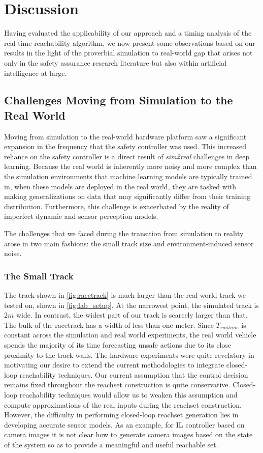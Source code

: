 \documentclass[manuscript,screen,review]{acmart}
\begin{document}
\section{Discussion}

Having evaluated the applicability of our approach and a timing analysis of the real-time reachability algorithm, we now present some observations based on our results in the light of the proverbial simulation to real-world gap that arises not only in the safety assurance research literature but also within artificial intelligence at large.

\subsection{Challenges Moving from Simulation to the Real World}

Moving from simulation to the real-world hardware platform saw a significant expansion in the frequency that the safety controller was used. This increased reliance on the safety controller is a direct result of \emph{sim2real} challenges in deep learning. Because the real world is inherently more noisy and more complex than the simulation environments that machine learning models are typically trained in, when these models are deployed in the real world, they are tasked with making generalizations on data that may significantly differ from their training distribution. Furthermore, this challenge is exacerbated by the reality of imperfect dynamic and sensor perception models\cite{ivanov2020case}.

The challenges that we faced during the transition from simulation to reality arose in two main fashions: the small track size and environment-induced sensor noise.

\subsubsection{The Small Track} The track shown in \ref{fig:racetrack} is much larger than the real world track we tested on, shown in \ref{fig:lab_setup}. At the narrowest point, the simulated track is $2m$ wide. In contrast, the widest part of our track is scarcely larger than that. The bulk of the racetrack has a width of less than one meter. Since $T_{runtime}$ is constant across the simulation and real world experiments, the real world vehicle spends the majority of its time forecasting unsafe actions due to its close proximity to the track walls. The hardware experiments were quite revelatory in motivating our desire to extend the current methodologies to integrate closed-loop reachability techniques. Our current assumption that the control decision remains fixed throughout the reachset construction is quite conservative. Closed-loop reachability techniques would allow us to weaken this assumption and compute approximations of the real inputs during the reachset construction. However, the difficulty in performing closed-loop reachset generation lies in developing accurate sensor models. As an example, for IL controller based on camera images it is not clear how to generate camera images based on the state of the system so as to provide a meaningful and useful reachable set.
\end{document}
